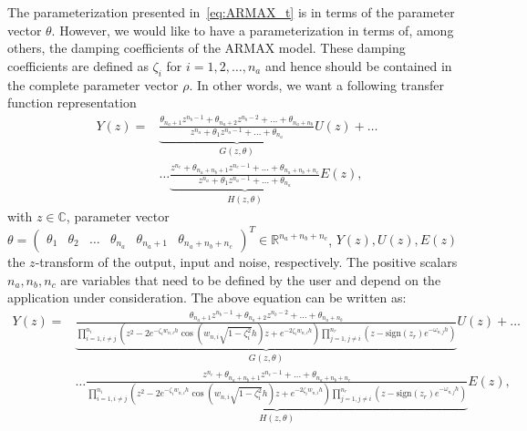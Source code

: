 \documentclass{article}
\begin{document}
The parameterization presented in~\eqref{eq:ARMAX_t} is in terms of the parameter vector $\theta$. However, we would like to have a parameterization in terms of, among others, the damping coefficients of the ARMAX model. These damping coefficients are defined as $\zeta_i$ for $i=1,2,\ldots,n_a$ and hence should be contained in the complete parameter vector $\rho$. In other words, we want a following transfer function representation
\begin{equation}
\begin{aligned}
Y(z) = &\underbrace{\frac{  \theta_{n_a+1} z^{n_b-1} + \theta_{n_a+2} z^{n_b-2} + \dots + \theta_{n_a+n_b}}{z^{n_a} + \theta_1 z^{n_a-1} + \dots + \theta_{n_a}}}_{G(z,\theta)} U(z) + \ldots \\
&\ldots \underbrace{\frac{ z^{n_c} + \theta_{n_a+n_b+1}  z^{n_c-1} + \dots + \theta_{n_a+n_b+n_c} }{z^{n_a} + \theta_1 z^{n_a-1} + \dots + \theta_{n_a}}}_{H(z,\theta)} E(z),
\label{eq:ARMAX_z_theta}
\end{aligned}
\end{equation}
with $z \in \mathbb{C}$, parameter vector $\theta = \begin{pmatrix} \theta_1 & \theta_2 & \dots & \theta_{n_a} & \theta_{n_a+1} & \theta_{n_a+n_b+n_c} \end{pmatrix}^T \in \mathbb{R}^{n_a+n_b+n_c}$, $Y(z),U(z),E(z)$ the $z$-transform of the output, input and noise, respectively. The positive scalars $n_a,n_b,n_c$ are variables that need to be defined by the user and depend on the application under consideration. The above equation can be written as:
\begin{equation}
\begin{aligned}
Y(z) = &\underbrace{\frac{  \theta_{n_a+1} z^{n_b-1} + \theta_{n_a+2} z^{n_b-2} + \dots + \theta_{n_a+n_b}}{   \prod_{i=1, i \neq j}^{n_i} \left( z^2 - 2 e^{-\zeta_i w_{n,i} h } \cos (w_{n,i} \sqrt{1-\zeta_i^2} h) z + e^{-2 \zeta_i w_{n,i} h}  \right)  \prod_{j=1, j \neq i}^{n_r} \left(  z-\text{sign}(z_r)e^{-\omega_{n,j}h} \right) }}_{G(z,\theta)} U(z) + \ldots \\
&\ldots \underbrace{\frac{ z^{n_c} + \theta_{n_a+n_b+1}  z^{n_c-1} + \dots + \theta_{n_a+n_b+n_c} }{       \prod_{i=1, i \neq j}^{n_i} \left( z^2 - 2 e^{-\zeta_i w_{n,i} h } \cos (w_{n,i} \sqrt{1-\zeta_i^2} h) z + e^{-2 \zeta_i w_{n,i} h}  \right)  \prod_{j=1, j \neq i}^{n_r} \left(  z-\text{sign}(z_r)e^{-\omega_{n,j}h} \right)      }}_{H(z,\theta)} E(z),
\label{eq:ARMAX_z_zeta}
\end{aligned}
\end{equation}
\end{document}
